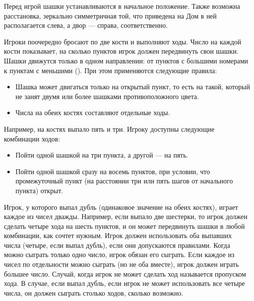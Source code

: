 Перед игрой шашки устанавливаются в начальное положение. Также возможна расстановка, зеркально симметричная той, что приведена на  Дом в ней располагается слева, а двор --- справа, соответственно.


Игроки поочередно бросают по две кости и выполняют ходы. Число на каждой кости показывает, на сколько пунктов игрок должен передвинуть свои шашки. Шашки движутся только в одном направлении: от пунктов с большими номерами к пунктам с меньшими (). При этом применяются следующие правила:
\begin{itemize}
    \item Шашка может двигаться только на открытый пункт, то есть на такой, который не занят двумя или более шашками противоположного цвета.
    \item Числа на обеих костях составляют отдельные ходы.
\end{itemize}


Например, на костях выпало пять и три. Игроку доступны следующие комбинации ходов:
\begin{itemize}
    \item Пойти одной шашкой на три пункта, а другой --- на пять.
    \item Пойти одной шашкой сразу на восемь пунктов, при условии, что промежуточный пункт (на расстоянии три или пять шагов от начального пункта) открыт.
\end{itemize}

Игрок, у которого выпал дубль (одинаковое значение на обеих костях), играет каждое из чисел дважды. Например, если выпало две шестерки, то игрок должен сделать четыре хода на шесть пунктов, и он может передвинуть шашки в любой комбинации, как сочтет нужным. Игрок должен использовать оба выпавших числа (четыре, если выпал дубль), если они допускаются правилами. Когда можно сыграть только одно число, игрок обязан его сыграть. Если каждое из чисел по отдельности можно сыграть (но не оба вместе), игрок должен играть большее число. Случай, когда игрок не может сделать ход называется пропуском хода. В случае, если выпал дубль, если игрок не может использовать все четыре числа, он должен сыграть столько ходов, сколько возможно.


